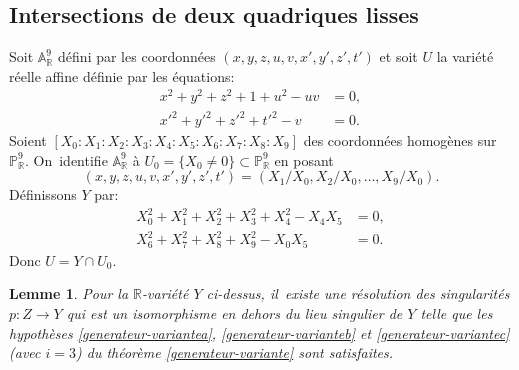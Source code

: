 \documentclass[11pt]{article}
\newtheorem{lemma}[thm]{Lemme}
\theoremstyle{definition}
\newcommand{\R}{\mathbb R}
\newcommand{\A}{\mathbb A}
\renewcommand{\P}{\mathbb P}
\begin{document}
\subsection{Intersections de deux quadriques lisses}

Soit $\A^9_\R$ défini par les coordonnées $(x, y, z, u, v, x', y', z', t')$ et soit $U$ la variété réelle affine définie par les équations:
\begin{align}
x^2+y^2+z^2+1+u^2 - uv &= 0, \label{eq:U1} \\
x'^2+y'^2+z'^2+t'^2 - v &= 0. \label{eq:U2}
\end{align}
Soient $[X_0: X_1: X_2: X_3: X_4: X_5: X_6: X_7: X_8: X_9]$ des coordonnées homogènes sur $\P^9_\R$. On~identifie $\A^9_\R$ à $U_0=\{X_0\neq 0\}\subset \P^9_\R$ en posant
\[(x,y,z,u,v,x',y',z',t')=(X_1/X_0,X_2/X_0,\dots, X_9/X_0).\]
Définissons $Y$ par:
\begin{align}
X_0^2+X_1^2+X_2^2+X_3^2+X_4^2 - X_4X_5 &= 0, \label{eq:F1} \\
X_6^2+X_7^2+X_8^2+X_9^2 -X_0X_5 &= 0. \label{eq:F2}
\end{align}
Donc $U=Y\cap U_0$.

\begin{lemma}\label{int-2-quadriques-a-c}
Pour la $\R$-variété $Y$ ci-dessus, il~existe une résolution des singularités $p\colon Z\to Y$ qui est un isomorphisme en dehors du lieu singulier de $Y$ telle que les hypothèses \eqref{generateur-variantea}, \eqref{generateur-varianteb} et \eqref{generateur-variantec} (avec $i=3$) du théorème \ref{generateur-variante} sont satisfaites.
\end{lemma}
\end{document}
